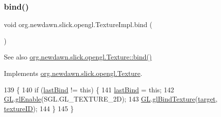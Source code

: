 \subsubsection{\texorpdfstring{bind()}{bind()}}
{\footnotesize\ttfamily void org.\+newdawn.\+slick.\+opengl.\+Texture\+Impl.\+bind (\begin{DoxyParamCaption}{ }\end{DoxyParamCaption})\hspace{0.3cm}{\ttfamily [inline]}}

\begin{DoxySeeAlso}{See also}
\mbox{\hyperlink{interfaceorg_1_1newdawn_1_1slick_1_1opengl_1_1_texture_a97c02b82a8170c4c0bccb570dc872873}{org.\+newdawn.\+slick.\+opengl.\+Texture\+::bind()}} 
\end{DoxySeeAlso}


Implements \mbox{\hyperlink{interfaceorg_1_1newdawn_1_1slick_1_1opengl_1_1_texture_a97c02b82a8170c4c0bccb570dc872873}{org.\+newdawn.\+slick.\+opengl.\+Texture}}.


\begin{DoxyCode}
139                        \{
140         \textcolor{keywordflow}{if} (\mbox{\hyperlink{classorg_1_1newdawn_1_1slick_1_1opengl_1_1_texture_impl_ae726e8066199fe500031c7058f3459c3}{lastBind}} != \textcolor{keyword}{this}) \{
141             \mbox{\hyperlink{classorg_1_1newdawn_1_1slick_1_1opengl_1_1_texture_impl_ae726e8066199fe500031c7058f3459c3}{lastBind}} = \textcolor{keyword}{this};
142             \mbox{\hyperlink{classorg_1_1newdawn_1_1slick_1_1opengl_1_1_texture_impl_ad672b5a41ba59c882980c429c09b6572}{GL}}.\mbox{\hyperlink{interfaceorg_1_1newdawn_1_1slick_1_1opengl_1_1renderer_1_1_s_g_l_a35991f93081980b303d6ccc5bd88c8da}{glEnable}}(SGL.GL\_TEXTURE\_2D);
143             \mbox{\hyperlink{classorg_1_1newdawn_1_1slick_1_1opengl_1_1_texture_impl_ad672b5a41ba59c882980c429c09b6572}{GL}}.\mbox{\hyperlink{interfaceorg_1_1newdawn_1_1slick_1_1opengl_1_1renderer_1_1_s_g_l_a7b546bba69c511f7d96d055ac1ed6a21}{glBindTexture}}(\mbox{\hyperlink{classorg_1_1newdawn_1_1slick_1_1opengl_1_1_texture_impl_a5809d68afec3342e54fc4520f04a596a}{target}}, \mbox{\hyperlink{classorg_1_1newdawn_1_1slick_1_1opengl_1_1_texture_impl_a6dba48b815f4fc5a37e9c4390f349c9e}{textureID}});
144         \}
145     \}
\end{DoxyCode}
\mbox{\label{classorg_1_1newdawn_1_1slick_1_1opengl_1_1_texture_impl_a868110ef047125f2e6d52f503cbc827b}} 
